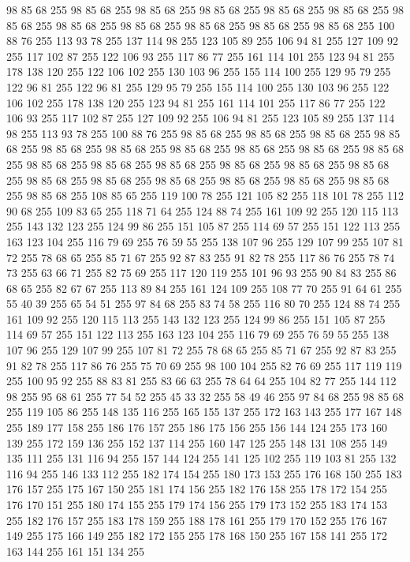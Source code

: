 98 85 68 255 98 85 68 255 98 85 68 255 98 85 68 255 98 85 68 255 98 85 68 255 98 85 68 255 98 85 68 255 98 85 68 255 98 85 68 255 98 85 68 255 98 85 68 255 100 88 76 255 113 93 78 255 137 114 98 255 123 105 89 255 106 94 81 255 127 109 92 255 117 102 87 255 122 106 93 255 117 86 77 255 161 114 101 255 123 94 81 255 178 138 120 255 122 106 102 255 130 103 96 255 155 114 100 255 129 95 79 255 122 96 81 255 122 96 81 255 129 95 79 255 155 114 100 255 130 103 96 255 122 106 102 255 178 138 120 255 123 94 81 255 161 114 101 255 117 86 77 255 122 106 93 255 117 102 87 255 127 109 92 255 106 94 81 255 123 105 89 255 137 114 98 255 113 93 78 255 100 88 76 255 98 85 68 255 98 85 68 255 98 85 68 255 98 85 68 255 98 85 68 255 98 85 68 255 98 85 68 255 98 85 68 255 98 85 68 255 98 85 68 255 98 85 68 255 98 85 68 255 98 85 68 255 98 85 68 255 98 85 68 255 98 85 68 255 98 85 68 255 98 85 68 255
98 85 68 255 98 85 68 255 98 85 68 255 98 85 68 255 98 85 68 255 108 85 65 255 119 100 78 255 121 105 82 255 118 101 78 255 112 90 68 255 109 83 65 255 118 71 64 255 124 88 74 255 161 109 92 255 120 115 113 255 143 132 123 255 124 99 86 255 151 105 87 255 114 69 57 255 151 122 113 255 163 123 104 255 116 79 69 255 76 59 55 255 138 107 96 255 129 107 99 255 107 81 72 255 78 68 65 255 85 71 67 255 92 87 83 255 91 82 78 255 117 86 76 255 78 74 73 255 63 66 71 255 82 75 69 255 117 120 119 255 101 96 93 255 90 84 83 255 86 68 65 255 82 67 67 255 113 89 84 255 161 124 109 255 108 77 70 255 91 64 61 255 55 40 39 255 65 54 51 255 97 84 68 255 83 74 58 255 116 80 70 255 124 88 74 255 161 109 92 255 120 115 113 255 143 132 123 255 124 99 86 255 151 105 87 255 114 69 57 255 151 122 113 255 163 123 104 255 116 79 69 255 76 59 55 255 138 107 96 255 129 107 99 255 107 81 72 255 78 68 65 255 85 71 67 255
92 87 83 255 91 82 78 255 117 86 76 255 75 70 69 255 98 100 104 255 82 76 69 255 117 119 119 255 100 95 92 255 88 83 81 255 83 66 63 255 78 64 64 255 104 82 77 255 144 112 98 255 95 68 61 255 77 54 52 255 45 33 32 255 58 49 46 255 97 84 68 255 98 85 68 255 119 105 86 255 148 135 116 255 165 155 137 255 172 163 143 255 177 167 148 255 189 177 158 255 186 176 157 255 186 175 156 255 156 144 124 255 173 160 139 255 172 159 136 255 152 137 114 255 160 147 125 255 148 131 108 255 149 135 111 255 131 116 94 255 157 144 124 255 141 125 102 255 119 103 81 255 132 116 94 255 146 133 112 255 182 174 154 255 180 173 153 255 176 168 150 255 183 176 157 255 175 167 150 255 181 174 156 255 182 176 158 255 178 172 154 255 176 170 151 255 180 174 155 255 179 174 156 255 179 173 152 255 183 174 153 255 182 176 157 255 183 178 159 255 188 178 161 255 179 170 152 255 176 167 149 255 175 166 149 255 182 172 155 255 178 168 150 255 167 158 141 255 172 163 144 255 161 151 134 255
